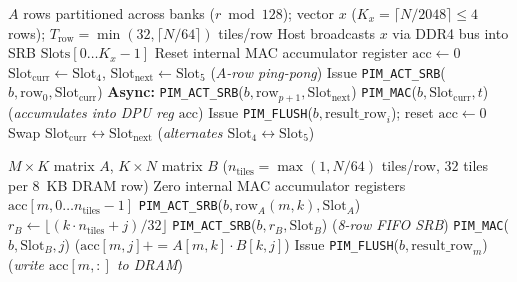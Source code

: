 \documentclass[conference]{IEEEtran}
\begin{document}
\begin{algorithm}[t]
\caption{Decoupled SRB GEMV Execution Pipeline ($y = A \cdot x$)}
\label{alg:srb_exec}
\small
\begin{algorithmic}[1]
\REQUIRE $A$ rows partitioned across banks ($r \bmod 128$); vector $x$ ($K_x = \lceil N/2048 \rceil \le 4$ rows); $T_{\text{row}} = \min(32, \lceil N/64 \rceil)$ tiles/row
\STATE Host broadcasts $x$ via DDR4 bus into SRB $\text{Slots}[0 \dots K_x{-}1]$
    \STATE Reset internal MAC accumulator register $\text{acc} \leftarrow 0$
    \STATE $\text{Slot}_{\text{curr}} \leftarrow \text{Slot}_4$, $\text{Slot}_{\text{next}} \leftarrow \text{Slot}_5$ \; (\textit{$A$-row ping-pong})
    \STATE Issue \texttt{PIM\_ACT\_SRB}($b, \text{row}_0, \text{Slot}_{\text{curr}}$)
            \STATE \textbf{Async:} \texttt{PIM\_ACT\_SRB}($b, \text{row}_{p+1}, \text{Slot}_{\text{next}}$)
        \ENDIF
            \STATE \texttt{PIM\_MAC}($b, \text{Slot}_{\text{curr}}, t$) \; (\textit{accumulates into DPU reg $\text{acc}$})
        \ENDFOR
            \STATE Issue \texttt{PIM\_FLUSH}($b, \text{result\_row}_i$); reset $\text{acc} \leftarrow 0$
        \ENDIF
        \STATE Swap $\text{Slot}_{\text{curr}} \leftrightarrow \text{Slot}_{\text{next}}$ \; (\textit{alternates $\text{Slot}_4 \leftrightarrow \text{Slot}_5$})
    \ENDFOR
\ENDFOR
\end{algorithmic}
\end{algorithm}

\begin{algorithm}[t]
\caption{Decoupled SRB GEMM Execution Pipeline ($C = A \cdot B$)}
\label{alg:srb_gemm}
\small
\begin{algorithmic}[1]
\REQUIRE $M \times K$ matrix $A$, $K \times N$ matrix $B$ ($n_{\text{tiles}} = \max(1, N/64)$ tiles/row, $32$ tiles per $8$~KB DRAM row)
    \STATE Zero internal MAC accumulator registers $\text{acc}[m, 0 \dots n_{\text{tiles}}{-}1]$
            \STATE \texttt{PIM\_ACT\_SRB}($b, \text{row}_A(m, k), \text{Slot}_A$)
        \ENDIF
            \STATE $r_B \leftarrow \lfloor (k \cdot n_{\text{tiles}} + j) / 32 \rfloor$
                \STATE \texttt{PIM\_ACT\_SRB}($b, r_B, \text{Slot}_B$) \; (\textit{8-row FIFO SRB})
            \ENDIF
            \STATE \texttt{PIM\_MAC}($b, \text{Slot}_B, j$) \; (\textit{$\text{acc}[m,j] += A[m,k] \cdot B[k,j]$})
        \ENDFOR
    \ENDFOR
    \STATE Issue \texttt{PIM\_FLUSH}($b, \text{result\_row}_m$) \; (\textit{write $\text{acc}[m,:]$ to DRAM})
\ENDFOR
\end{algorithmic}
\end{algorithm}
\end{document}
